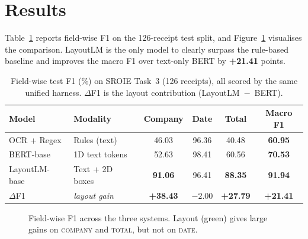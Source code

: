 \documentclass[11pt]{article}
\begin{document}
\section{Results}
Table~\ref{tab:main} reports field-wise F1 on the 126-receipt test split, and
Figure~\ref{fig:bench} visualises the comparison. LayoutLM is the only model to
clearly surpass the rule-based baseline and improves the macro F1 over text-only
BERT by \textbf{+21.41} points.

\begin{table}[t]
\centering
\caption{Field-wise test F1 (\%) on SROIE Task~3 (126 receipts), all scored by
the same unified harness. $\Delta$F1 is the layout contribution
(LayoutLM~$-$~BERT).}
\label{tab:main}
\begin{tabular}{llcccc}
\toprule
Model & Modality & Company & Date & Total & \textbf{Macro F1}\\
\midrule
OCR + Regex   & Rules (text)          & 46.03 & 96.36 & 40.48 & \textbf{60.95}\\
BERT-base     & 1D text tokens        & 52.63 & 98.41 & 60.56 & \textbf{70.53}\\
LayoutLM-base & Text + 2D boxes       & \textbf{91.06} & 96.41 & \textbf{88.35} & \textbf{91.94}\\
\midrule
$\Delta$F1    & \textit{layout gain}  & \textbf{+38.43} & $-2.00$ & \textbf{+27.79} & \textbf{+21.41}\\
\bottomrule
\end{tabular}
\end{table}

\begin{figure}[t]
\centering
{}
\caption{Field-wise F1 across the three systems. Layout (green) gives large gains
on \textsc{company} and \textsc{total}, but not on \textsc{date}.}
\label{fig:bench}
\end{figure}
\end{document}
